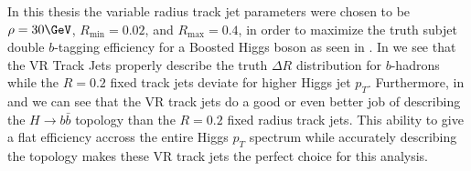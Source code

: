 In this thesis the variable radius track jet parameters were chosen to be $\rho
= 30\GeV$, $R_{\text{min}}=0.02$, and $R_{\text{max}}=0.4$, in order to
maximize the truth subjet double $b$-tagging efficiency for a Boosted Higgs
boson \cite{ATL-PHYS-PUB-2017-010} as seen in .  In
 we see that the VR Track Jets properly
describe the truth $\Delta R$ distribution for $b$-hadrons while the $R=0.2$
fixed track jets deviate for higher Higgs jet $p_{T}$.  Furthermore, in
 and  we can see
that the VR track jets do a good or even better job of describing the $H
\rightarrow b\bar{b}$ topology than the $R=0.2$ fixed radius track jets.  This
ability to give a flat efficiency accross the entire Higgs $p_{T}$ spectrum
while accurately describing the topology makes these VR track jets the perfect
choice for this analysis.

